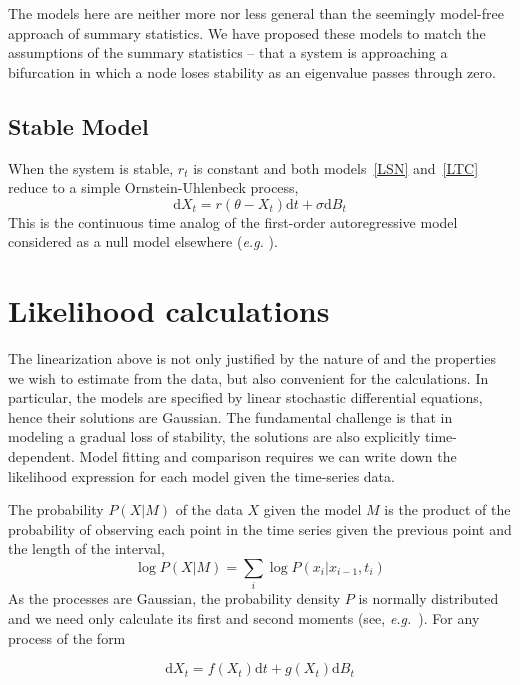 \documentclass[authoryear, preprint,review,12pt]{elsarticle}
\newcommand{\ud}{\mathrm{d}}
\begin{document}
The models here are neither more nor less general than the seemingly model-free approach of summary statistics.  
We have proposed these models to match the assumptions of the summary statistics -- 
that a system is approaching a bifurcation in which a node loses stability as an eigenvalue passes through zero.  


\subsection{Stable Model}
When the system is stable, $r_t$ is constant and both models~\eqref{LSN} and~\eqref{LTC} reduce to a simple Ornstein-Uhlenbeck process, 
\begin{equation}
\ud X_t = r (\theta - X_t) \ud t + \sigma \ud B_t \label{OU}
\end{equation}
This is the continuous time analog of the first-order autoregressive model considered as a null model elsewhere (\emph{e.g.} \citet{Dakos2008, Guttal2008a}).  

\section{Likelihood calculations}\label{likelihood}
The linearization above is not only justified by the nature of and the properties we wish to estimate from the data,
but also convenient for the calculations. 
In particular, the models are specified by linear stochastic differential equations, hence their solutions are Gaussian.
The fundamental challenge is that in modeling a gradual loss of stability, the solutions are also explicitly time-dependent.
Model fitting and comparison requires we can write down the likelihood expression for each model given the time-series data.  

The probability $P(X|M)$ of the data $X$ given the model $M$ is the product of the probability of observing each point in the time series given the previous point and the length of the interval,  
\begin{equation}
\log P(X | M)=  \sum_i \log P(x_i | x_{i-1}, t_i)
\end{equation}
As the processes are Gaussian, the probability density $P$ is normally distributed and we need only calculate its first and second moments (see, \emph{e.g.}~\citep{Gardiner2009}). For any process of the form

\begin{equation}
  \ud X_t = f(X_t) \ud t + g(X_t) \ud B_t 
  \label{general}
\end{equation}
\end{document}

